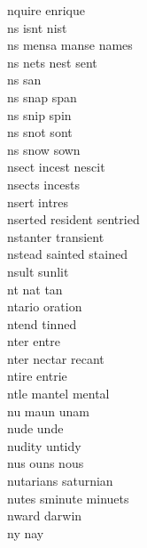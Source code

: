 nquire enrique \\
ns isnt nist  \\
ns mensa manse names   \\
ns nets nest sent  \\
ns san \\
ns snap span  \\
ns snip spin  \\
ns snot sont  \\
ns snow sown  \\
nsect incest nescit \\
nsects incests \\
nsert intres \\
nserted resident sentried \\
nstanter transient \\
nstead sainted stained \\
nsult sunlit \\
nt nat tan \\
ntario oration \\
ntend tinned \\
nter entre \\
nter nectar recant  \\
ntire entrie \\
ntle mantel mental  \\
nu maun unam  \\
nude unde\\
nudity untidy\\
nus ouns nous \\
nutarians saturnian\\
nutes sminute minuets  \\
nward darwin \\
ny nay \\

